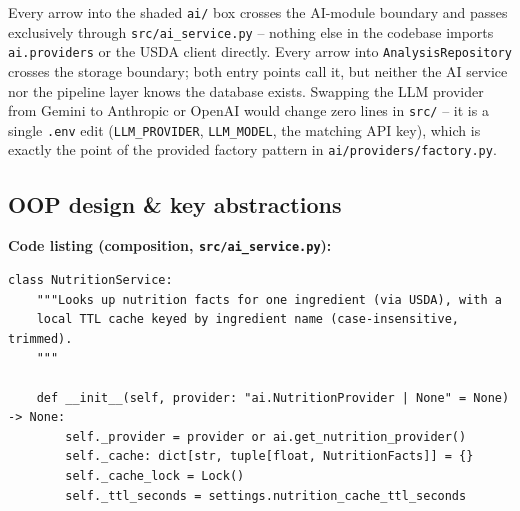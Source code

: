 \documentclass[11pt,a4paper]{article}
\begin{document}
Every arrow into the shaded \texttt{ai/} box crosses the AI-module boundary and passes exclusively through \texttt{src/ai\_service.py} -- nothing else in the codebase imports \texttt{ai.providers} or the USDA client directly. Every arrow into \texttt{AnalysisRepository} crosses the storage boundary; both entry points call it, but neither the AI service nor the pipeline layer knows the database exists. Swapping the LLM provider from Gemini to Anthropic or OpenAI would change zero lines in \texttt{src/} -- it is a single \texttt{.env} edit (\texttt{LLM\_PROVIDER}, \texttt{LLM\_MODEL}, the matching API key), which is exactly the point of the provided factory pattern in \texttt{ai/providers/factory.py}.

\subsection{OOP design \& key abstractions}

\textbf{Code listing (composition, \texttt{src/ai\_service.py}):}
\begin{lstlisting}[style=python]
class NutritionService:
    """Looks up nutrition facts for one ingredient (via USDA), with a
    local TTL cache keyed by ingredient name (case-insensitive, trimmed).
    """

    def __init__(self, provider: "ai.NutritionProvider | None" = None) -> None:
        self._provider = provider or ai.get_nutrition_provider()
        self._cache: dict[str, tuple[float, NutritionFacts]] = {}
        self._cache_lock = Lock()
        self._ttl_seconds = settings.nutrition_cache_ttl_seconds
\end{lstlisting}
\end{document}
